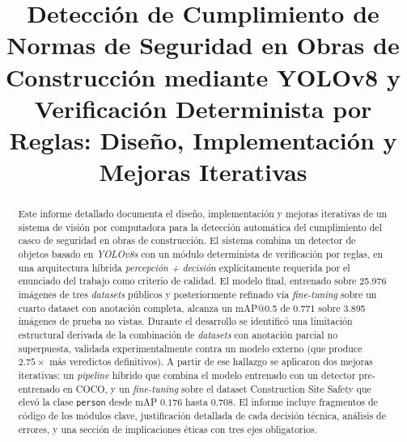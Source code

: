 \documentclass[journal,onecolumn,11pt]{IEEEtran}
\begin{document}
\title{Detección de Cumplimiento de Normas de Seguridad en Obras
de Construcción mediante YOLOv8 y Verificación Determinista por
Reglas: Diseño, Implementación y Mejoras Iterativas}

\author{
}

\maketitle

\begin{abstract}
Este informe detallado documenta el diseño, implementación y mejoras
iterativas de un sistema de visión por computadora para la detección
automática del cumplimiento del casco de seguridad en obras de
construcción. El sistema combina un detector de objetos basado en
\textit{YOLOv8s} con un módulo determinista de verificación por
reglas, en una arquitectura híbrida \textit{percepción + decisión}
explícitamente requerida por el enunciado del trabajo como criterio
de calidad. El modelo final, entrenado sobre 25.976 imágenes de tres
\textit{datasets} públicos y posteriormente refinado vía
\textit{fine-tuning} sobre un cuarto dataset con anotación
completa, alcanza un mAP@0.5 de 0.771 sobre 3.895 imágenes de prueba
no vistas. Durante el desarrollo se identificó una limitación
estructural derivada de la combinación de \textit{datasets} con
anotación parcial no superpuesta, validada experimentalmente
contra un modelo externo (que produce $2.75\times$ más veredictos
definitivos). A partir de ese hallazgo se aplicaron dos mejoras
iterativas: un \textit{pipeline} híbrido que combina el modelo
entrenado con un detector pre-entrenado en COCO, y un
\textit{fine-tuning} sobre el dataset Construction Site Safety que
elevó la clase \texttt{person} desde mAP $0.176$ hasta $0.708$. El
informe incluye fragmentos de código de los módulos clave,
justificación detallada de cada decisión técnica, análisis de errores,
y una sección de implicaciones éticas con tres ejes obligatorios.
\end{abstract}
\end{document}
